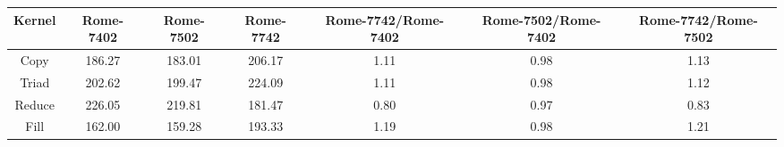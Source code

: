 \begin{tabular}{|c|c|c|c|c|c|c|}  \hline
Kernel&Rome-7402&Rome-7502&Rome-7742 & Rome-7742/Rome-7402 & Rome-7502/Rome-7402 & Rome-7742/Rome-7502 \\ \hline 
Copy & 186.27 & 183.01 & 206.17  & 1.11 & 0.98 & 1.13 \\ \hline 
Triad & 202.62 & 199.47 & 224.09  & 1.11 & 0.98 & 1.12 \\ \hline 
Reduce & 226.05 & 219.81 & 181.47  & 0.80 & 0.97 & 0.83 \\ \hline 
Fill & 162.00 & 159.28 & 193.33  & 1.19 & 0.98 & 1.21 \\ \hline 
\end{tabular}
